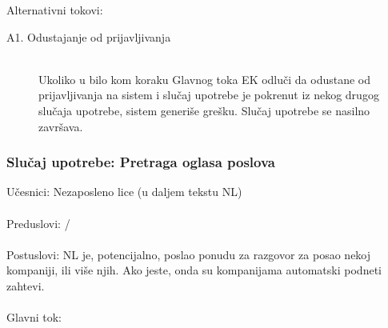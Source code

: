 \noindent Alternativni tokovi: 
\begin{description}
	\item[A1. Odustajanje od prijavljivanja] ~\\
		Ukoliko u bilo kom koraku Glavnog toka EK odlu\v ci da odustane od prijavljivanja na sistem i slu\v caj upotrebe je pokrenut iz nekog drugog slu\v caja upotrebe, sistem generi\v se gre\v sku. Slu\v caj upotrebe se nasilno zavr\v sava.
\end{description}

\subsubsection{Slu\v caj upotrebe: Pretraga oglasa poslova}
\label{su: pretraga oglasa poslova}

\noindent U\v cesnici: Nezaposleno lice (u daljem tekstu NL)
\\
\\ Preduslovi: /
\\
\\ Postuslovi: NL je, potencijalno, poslao ponudu za razgovor za posao nekoj kompaniji, ili vi\v se njih. Ako jeste, onda su kompanijama automatski podneti zahtevi.
\\ 
\\ Glavni tok:
